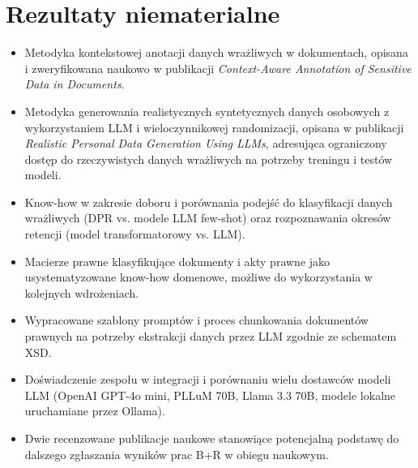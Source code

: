 \documentclass[12pt,a4paper]{report}
\begin{document}
\section{Rezultaty niematerialne}
\begin{itemize}
    \item Metodyka kontekstowej anotacji danych wrażliwych w dokumentach, opisana i zweryfikowana naukowo w publikacji \textit{Context-Aware Annotation of Sensitive Data in Documents}.
    \item Metodyka generowania realistycznych syntetycznych danych osobowych z wykorzystaniem LLM i wieloczynnikowej randomizacji, opisana w publikacji \textit{Realistic Personal Data Generation Using LLMs}, adresująca ograniczony dostęp do rzeczywistych danych wrażliwych na potrzeby treningu i testów modeli.
    \item Know-how w zakresie doboru i porównania podejść do klasyfikacji danych wrażliwych (DPR vs. modele LLM few-shot) oraz rozpoznawania okresów retencji (model transformatorowy vs. LLM).
    \item Macierze prawne klasyfikujące dokumenty i akty prawne jako usystematyzowane know-how domenowe, możliwe do wykorzystania w kolejnych wdrożeniach.
    \item Wypracowane szablony promptów i proces chunkowania dokumentów prawnych na potrzeby ekstrakcji danych przez LLM zgodnie ze schematem XSD.
    \item Doświadczenie zespołu w integracji i porównaniu wielu dostawców modeli LLM (OpenAI GPT-4o mini, PLLuM 70B, Llama 3.3 70B, modele lokalne uruchamiane przez Ollama).
    \item Dwie recenzowane publikacje naukowe stanowiące potencjalną podstawę do dalszego zgłaszania wyników prac B+R w obiegu naukowym.
\end{itemize}
\end{document}
